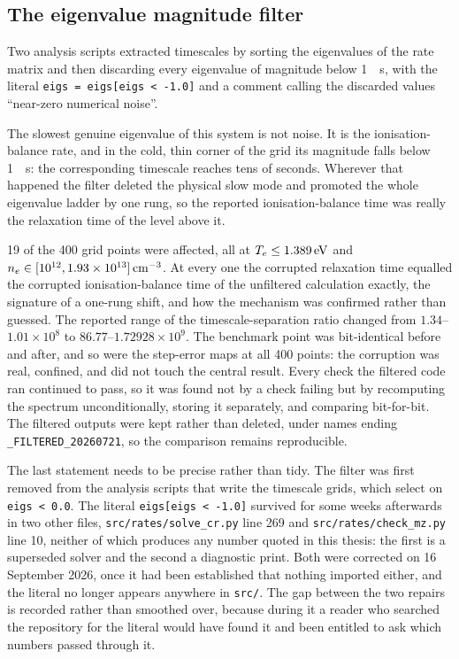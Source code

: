 \subsection{The eigenvalue magnitude filter}

Two analysis scripts extracted timescales by sorting the eigenvalues of the rate
matrix and then discarding every eigenvalue of magnitude below
\SI{1}{\per\second}, with the literal \texttt{eigs = eigs[eigs < -1.0]} and a
comment calling the discarded values ``near-zero numerical noise''.

The slowest genuine eigenvalue of this system is not noise. It is the
ionisation-balance rate, and in the cold, thin corner of the grid its magnitude
falls below \SI{1}{\per\second}: the corresponding timescale reaches tens of
seconds. Wherever that happened the filter deleted the physical slow mode and
promoted the whole eigenvalue ladder by one rung, so the reported
ionisation-balance time was really the relaxation time of the level above it.

19 of the 400 grid points were affected, all at $T_e \le
\SI{1.389}{\electronvolt}$ and $n_e \in
[10^{12}, 1.93\times10^{13}]\,\si{\per\cubic\centi\metre}$. At every one the
corrupted relaxation time equalled the corrupted ionisation-balance time of the
unfiltered calculation exactly, the signature of a one-rung shift, and how the
mechanism was confirmed rather than guessed. The reported range of the
timescale-separation ratio changed from $1.34$--$1.01\times10^{8}$ to
$86.77$--$1.72928\times10^{9}$. The benchmark point was bit-identical before and
after, and so were the step-error maps at all 400 points: the corruption was
real, confined, and did not touch the central result. Every check the filtered
code ran continued to pass, so it was found not by a check failing but by
recomputing the spectrum unconditionally, storing it separately, and comparing
bit-for-bit. The filtered outputs were kept rather than deleted, under names
ending \texttt{\_FILTERED\_20260721}, so the comparison remains reproducible.

The last statement needs to be precise rather than tidy. The filter
was first removed from the analysis scripts that write the timescale grids, which
select on \texttt{eigs < 0.0}. The literal \texttt{eigs[eigs < -1.0]} survived
for some weeks afterwards in two other files, \texttt{src/rates/solve\_cr.py}
line 269 and \texttt{src/rates/check\_mz.py} line 10, neither of which produces
any number quoted in this thesis: the first is a superseded solver and the second
a diagnostic print. Both were corrected on 16 September 2026, once it had been
established that nothing imported either, and the literal no longer appears
anywhere in \texttt{src/}. The gap between the two repairs is recorded rather
than smoothed over, because during it a reader who searched the repository for
the literal would have found it and been entitled to ask which numbers passed
through it.

